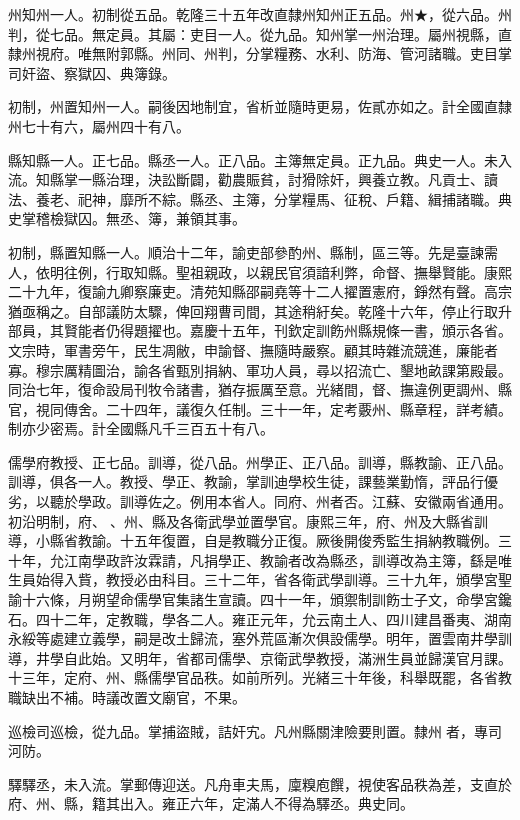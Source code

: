 \begin{pinyinscope}
州知州一人。初制從五品。乾隆三十五年改直隸州知州正五品。州★，從六品。州判，從七品。無定員。其屬：吏目一人。從九品。知州掌一州治理。屬州視縣，直隸州視府。唯無附郭縣。州同、州判，分掌糧務、水利、防海、管河諸職。吏目掌司奸盜、察獄囚、典簿錄。

初制，州置知州一人。嗣後因地制宜，省析並隨時更易，佐貳亦如之。計全國直隸州七十有六，屬州四十有八。

縣知縣一人。正七品。縣丞一人。正八品。主簿無定員。正九品。典史一人。未入流。知縣掌一縣治理，決訟斷闢，勸農賑貧，討猾除奸，興養立教。凡貢士、讀法、養老、祀神，靡所不綜。縣丞、主簿，分掌糧馬、征稅、戶籍、緝捕諸職。典史掌稽檢獄囚。無丞、簿，兼領其事。

初制，縣置知縣一人。順治十二年，諭吏部參酌州、縣制，區三等。先是臺諫需人，依明往例，行取知縣。聖祖親政，以親民官須諳利弊，命督、撫舉賢能。康熙二十九年，復諭九卿察廉吏。清苑知縣邵嗣堯等十二人擢置憲府，錚然有聲。高宗猶亟稱之。自部議防太驟，俾回翔曹司間，其途稍紆矣。乾隆十六年，停止行取升部員，其賢能者仍得題擢也。嘉慶十五年，刊欽定訓飭州縣規條一書，頒示各省。文宗時，軍書旁午，民生凋敝，申諭督、撫隨時嚴察。顧其時雜流競進，廉能者寡。穆宗厲精圖治，諭各省甄別捐納、軍功人員，尋以招流亡、墾地畝課第殿最。同治七年，復命設局刊牧令諸書，猶存振厲至意。光緒間，督、撫違例更調州、縣官，視同傳舍。二十四年，議復久任制。三十一年，定考覈州、縣章程，詳考績。制亦少密焉。計全國縣凡千三百五十有八。

儒學府教授、正七品。訓導，從八品。州學正、正八品。訓導，縣教諭、正八品。訓導，俱各一人。教授、學正、教諭，掌訓迪學校生徒，課藝業勤惰，評品行優劣，以聽於學政。訓導佐之。例用本省人。同府、州者否。江蘇、安徽兩省通用。初沿明制，府、、州、縣及各衛武學並置學官。康熙三年，府、州及大縣省訓導，小縣省教諭。十五年復置，自是教職分正復。厥後開俊秀監生捐納教職例。三十年，允江南學政許汝霖請，凡捐學正、教諭者改為縣丞，訓導改為主簿，繇是唯生員始得入貲，教授必由科目。三十二年，省各衛武學訓導。三十九年，頒學宮聖諭十六條，月朔望命儒學官集諸生宣讀。四十一年，頒禦制訓飭士子文，命學宮鑱石。四十二年，定教職，學各二人。雍正元年，允云南土人、四川建昌番夷、湖南永綏等處建立義學，嗣是改土歸流，塞外荒區漸次俱設儒學。明年，置雲南井學訓導，井學自此始。又明年，省都司儒學、京衛武學教授，滿洲生員並歸漢官月課。十三年，定府、州、縣儒學官品秩。如前所列。光緒三十年後，科舉既罷，各省教職缺出不補。時議改置文廟官，不果。

巡檢司巡檢，從九品。掌捕盜賊，詰奸宄。凡州縣關津險要則置。隸州者，專司河防。

驛驛丞，未入流。掌郵傳迎送。凡舟車夫馬，廩糗庖饌，視使客品秩為差，支直於府、州、縣，籍其出入。雍正六年，定滿人不得為驛丞。典史同。


\end{pinyinscope}
